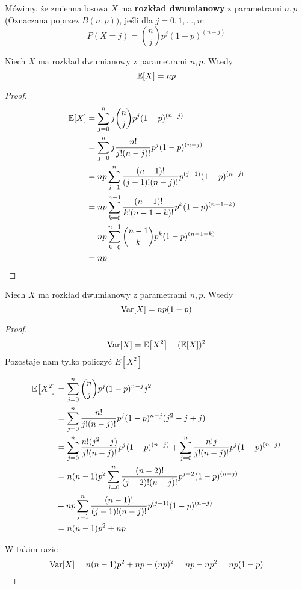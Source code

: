 \begin{definition}
    Mówimy, że zmienna losowa \( X \) ma \textbf{rozkład dwumianowy} z parametrami \( n, p \) (Oznaczana poprzez \(B(n, p))\), jeśli
    dla \( j = 0, 1,..., n \): 
    \[
        P(X = j) = \binom{n}{j}p^j(1-p)^{(n-j)}
    \]
\end{definition}

\begin{theorem}
    Niech \( X \) ma rozkład dwumianowy z parametrami \(n, p \). Wtedy
    \[
        \expected{X} = np
    \]
\end{theorem}

\begin{proof}
    \begin{align*}
    \expected{X} 
        &= \sum_{j=0}^nj\binom{n}{j}p^j(1-p)^{(n-j)} \\
        &= \sum_{j=0}^nj\frac{n!}{j!(n-j)!}p^j(1-p)^{(n-j)} \\
        &= np\sum_{j=1}^n\frac{(n-1)!}{(j-1)!(n-j)!}p^{(j-1)}(1-p)^{(n-j)} \\
        &= np\sum_{k=0}^{n-1}\frac{(n-1)!}{k!(n-1-k)!}p^{k}(1-p)^{(n-1-k)} \\
        &= np\sum_{k=0}^{n-1}\binom{n-1}{k}p^{k}(1-p)^{(n-1-k)} \\
        &= np
    \end{align*}
\end{proof}

\begin{theorem}
    Niech \( X \) ma rozkład dwumianowy z parametrami \(n, p \). Wtedy
    \[
        \variance{X} = np(1-p)
    \]
\end{theorem}

\begin{proof}
    \[
    \variance{X} = \expected{X^2} - (\expected{X})^2
    \]
    Pozostaje nam tylko policzyć \( E[X^2]\)
    
    \begin{align*}
        \expected{X^2} 
            &= \sum_{j=0}^n\binom{n}{j}p^j(1-p)^{n-j}j^2 \\
            &= \sum_{j=0}^n\frac{n!}{j!(n-j)!}p^j(1-p)^{n-j}(j^2-j+j) \\
            &= \sum_{j=0}^n\frac{n!(j^2-j)}{j!(n-j)!}p^j(1-p)^{(n-j)} +\sum_{j=0}^n\frac{n!j}{j!(n-j)!}p^j(1-p)^{(n-j)} \\
            &= n(n-1)p^2 \sum_{j=0}^n\frac{(n-2)!}{(j-2)!(n-j)!}p^{j-2}(1-p)^{(n-j)}\\
            &+np\sum_{j=1}^n\frac{(n-1)!}{(j-1)!(n-j)!}p^{(j-1)}(1-p)^{(n-j)} \\
        &= n(n-1)p^2 + np
    \end{align*}
    
    W takim razie
    \[ \variance{X} = n(n-1)p^2 + np - (np)^2 = np - np^2 = np(1-p) \]
\end{proof}

